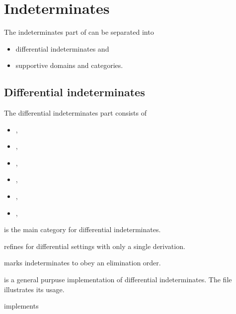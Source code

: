 \clearpage
\section{Indeterminates}


The indeterminates part of \LibCharSet can be separated into

\begin{itemize}
\item differential indeterminates and
\item supportive domains and categories.
\end{itemize}





\subsection{Differential indeterminates}

The differential indeterminates part consists of 
\begin{itemize}
\item {},
\item {},
\item {},
\item {},
\item {},
\item {},
\end{itemize}

 is the main category for differential indeterminates.

 refines  for differential settings with only a single derivation.

 marks indeterminates to obey an elimination order.

 is a general purpuse implementation of differential indeterminates. The file  illustrates its usage.

\clearpage
{}


 implements  

